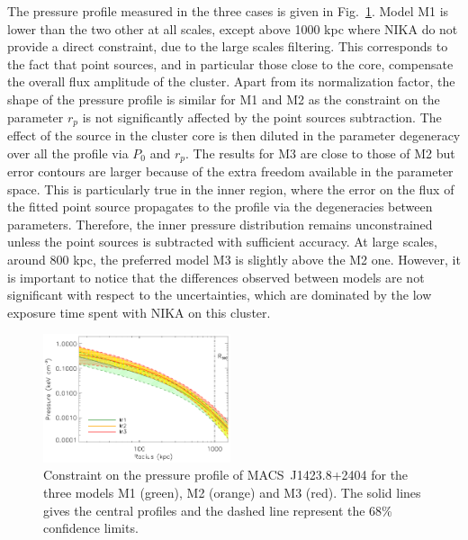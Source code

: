\documentclass[twocolumn,traditabstract]{aa}
\begin{document}
The pressure profile measured in the three cases is given in Fig.~\ref{fig:MACSJ1424_pressure_point_source}. Model M1 is lower than the two other at all scales, except above 1000 kpc where NIKA do not provide a direct constraint, due to the large scales filtering. This corresponds to the fact that point sources, and in particular those close to the core, compensate the overall flux amplitude of the cluster. Apart from its normalization factor, the shape of the pressure profile is similar for M1 and M2 as the constraint on the parameter $r_p$ is not significantly affected by the point sources subtraction. The effect of the source in the cluster core is then diluted in the parameter degeneracy over all the profile via $P_0$ and $r_p$. The results for M3 are close to those of M2 but error contours are larger because of the extra freedom available in the parameter space. This is particularly true in the inner region, where the error on the flux of the fitted point source propagates to the profile via the degeneracies between parameters. Therefore, the inner pressure distribution remains unconstrained unless the point sources is subtracted with sufficient accuracy. At large scales, around 800 kpc, the preferred model M3 is slightly above the M2 one. However, it is important to notice that the differences observed between models are not significant with respect to the uncertainties, which are dominated by the low exposure time spent with NIKA on this cluster.
\begin{figure}[h]
\centering
\includegraphics[width=0.49\textwidth]{Figure/ICM_pressure_profile_point_sources.pdf}
\caption{Constraint on the pressure profile of \mbox{MACS~J1423.8+2404} for the three models M1 (green), M2 (orange) and M3 (red). The solid lines gives the central profiles and the dashed line represent the 68\% confidence limits.}
\label{fig:MACSJ1424_pressure_point_source}
\end{figure}
\end{document}
